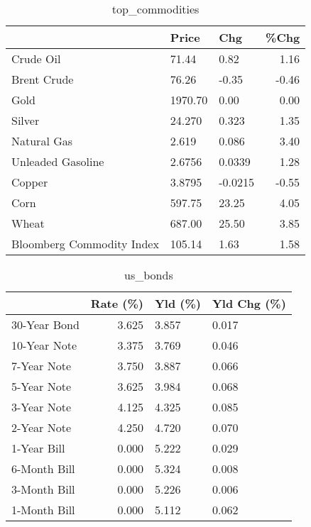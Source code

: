 \documentclass{article}%
\begin{document}
\begin{table}[htbp]%
\caption{top\_commodities}%
\centering%
\begin{adjustbox}{width=1\textwidth}%
\begin{tabular}{lllr}
\toprule
                          &   Price &     Chg &  \%Chg \\
\midrule
               Crude Oil  &   71.44 &    0.82 &  1.16 \\
             Brent Crude  &   76.26 &   -0.35 & -0.46 \\
                    Gold  & 1970.70 &    0.00 &  0.00 \\
                  Silver  &  24.270 &   0.323 &  1.35 \\
             Natural Gas  &   2.619 &   0.086 &  3.40 \\
       Unleaded Gasoline  &  2.6756 &  0.0339 &  1.28 \\
                  Copper  &  3.8795 & -0.0215 & -0.55 \\
                    Corn  &  597.75 &   23.25 &  4.05 \\
                   Wheat  &  687.00 &   25.50 &  3.85 \\
Bloomberg Commodity Index &  105.14 &    1.63 &  1.58 \\
\bottomrule
\end{tabular}
%
\end{adjustbox}%
\end{table}

%


\begin{table}[htbp]%
\caption{us\_bonds}%
\centering%
\begin{adjustbox}{width=1\textwidth}%
\begin{tabular}{lrll}
\toprule
             &  Rate (\%) & Yld (\%) & Yld Chg (\%) \\
\midrule
30-Year Bond &     3.625 &   3.857 &       0.017 \\
10-Year Note &     3.375 &   3.769 &       0.046 \\
 7-Year Note &     3.750 &   3.887 &       0.066 \\
 5-Year Note &     3.625 &   3.984 &       0.068 \\
 3-Year Note &     4.125 &   4.325 &       0.085 \\
 2-Year Note &     4.250 &   4.720 &       0.070 \\
 1-Year Bill &     0.000 &   5.222 &       0.029 \\
6-Month Bill &     0.000 &   5.324 &       0.008 \\
3-Month Bill &     0.000 &   5.226 &       0.006 \\
1-Month Bill &     0.000 &   5.112 &       0.062 \\
\bottomrule
\end{tabular}
%
\end{adjustbox}%
\end{table}
\end{document}
